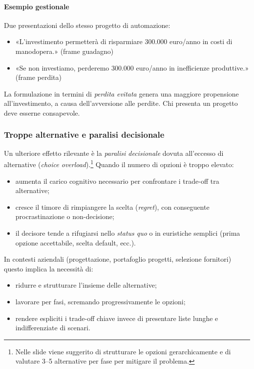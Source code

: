 \documentclass[a4paper,12pt]{article}
\begin{document}
	\paragraph{Esempio gestionale}
	
	Due presentazioni dello stesso progetto di automazione:
	\begin{itemize}
		\item «L'investimento permetterà di risparmiare 300.000 euro/anno in costi di manodopera.» (frame guadagno)
		\item «Se non investiamo, perderemo 300.000 euro/anno in inefficienze produttive.» (frame perdita)
	\end{itemize}
	La formulazione in termini di \emph{perdita evitata} genera una maggiore propensione all'investimento, a causa dell'avversione alle perdite. Chi presenta un progetto deve esserne consapevole.
	
	\subsubsection{Troppe alternative e paralisi decisionale}
	
	Un ulteriore effetto rilevante è la \emph{paralisi decisionale} dovuta all'eccesso di alternative (\emph{choice overload}).\footnote{Nelle slide viene suggerito di strutturare le opzioni gerarchicamente e di valutare 3–5 alternative per fase per mitigare il problema. }%
	Quando il numero di opzioni è troppo elevato:
	\begin{itemize}
		\item aumenta il carico cognitivo necessario per confrontare i trade-off tra alternative;
		\item cresce il timore di rimpiangere la scelta (\emph{regret}), con conseguente procrastinazione o non-decisione;
		\item il decisore tende a rifugiarsi nello \emph{status quo} o in euristiche semplici (prima opzione accettabile, scelta default, ecc.).
	\end{itemize}
	
	In contesti aziendali (progettazione, portafoglio progetti, selezione fornitori) questo implica la necessità di:
	\begin{itemize}
		\item ridurre e strutturare l'insieme delle alternative;
		\item lavorare per fasi, scremando progressivamente le opzioni;
		\item rendere espliciti i trade-off chiave invece di presentare liste lunghe e indifferenziate di scenari.%
	\end{itemize}
\end{document}
